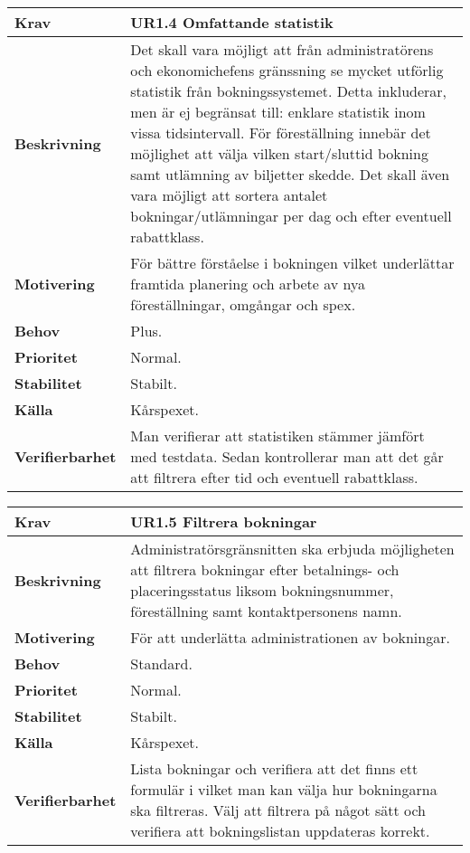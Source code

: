 \documentclass[a4paper, twoside, 11pt, titlepage]{article}
\begin{document}
		\begin{tabular} { p{2.6cm} p{12.5cm} }
			\hline
			\sffamily\textbf{Krav} & \sffamily\textbf{UR1.4 Omfattande statistik  } \\
			\hline
			\sffamily\textbf{Beskrivning} & Det skall vara möjligt att från administratörens och ekonomichefens gränssning se mycket utförlig statistik från bokningssystemet. Detta inkluderar, men är ej begränsat till: enklare statistik inom vissa tidsintervall. För föreställning innebär det möjlighet att välja vilken start/sluttid bokning samt utlämning av biljetter skedde. Det skall även vara möjligt att sortera antalet bokningar/utlämningar per dag och efter eventuell rabattklass.  \\
			\hline
			\sffamily\textbf{Motivering} & För bättre förståelse i bokningen vilket underlättar framtida planering och arbete av nya föreställningar, omgångar och spex.  \\
			\hline
			\sffamily\textbf{Behov} & Plus.  \\
			\hline
			\sffamily\textbf{Prioritet} & Normal.  \\
			\hline
			\sffamily\textbf{Stabilitet} & Stabilt.  \\
			\hline
			\sffamily\textbf{Källa} & Kårspexet.  \\
			\hline
			\sffamily\textbf{Verifierbarhet} & Man verifierar att statistiken stämmer jämfört med testdata. Sedan kontrollerar man att det går att filtrera efter tid och eventuell rabattklass.  \\
			\hline
		\end{tabular}
		\vspace{6mm}

		\begin{tabular} { p{2.6cm} p{12.5cm} }
			\hline
			\sffamily\textbf{Krav} & \sffamily\textbf{UR1.5 Filtrera bokningar  } \\
			\hline
			\sffamily\textbf{Beskrivning} & Administratörsgränsnitten ska erbjuda möjligheten att filtrera bokningar efter betalnings- och placeringsstatus liksom bokningsnummer, föreställning samt kontaktpersonens namn.  \\
			\hline
			\sffamily\textbf{Motivering} & För att underlätta administrationen av bokningar.  \\
			\hline
			\sffamily\textbf{Behov} & Standard.  \\
			\hline
			\sffamily\textbf{Prioritet} & Normal.  \\
			\hline
			\sffamily\textbf{Stabilitet} & Stabilt.  \\
			\hline
			\sffamily\textbf{Källa} & Kårspexet.  \\
			\hline
			\sffamily\textbf{Verifierbarhet} & Lista bokningar och verifiera att det finns ett formulär i vilket man kan välja hur bokningarna ska filtreras. Välj att filtrera på något sätt och verifiera att bokningslistan uppdateras korrekt.  \\
			\hline
		\end{tabular}
		\vspace{6mm}
\end{document}
